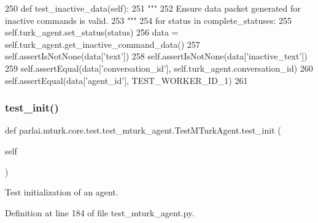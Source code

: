 \begin{DoxyCode}
250     \textcolor{keyword}{def }test\_inactive\_data(self):
251         \textcolor{stringliteral}{"""}
252 \textcolor{stringliteral}{        Ensure data packet generated for inactive commands is valid.}
253 \textcolor{stringliteral}{        """}
254         \textcolor{keywordflow}{for} status \textcolor{keywordflow}{in} complete\_statuses:
255             self.turk\_agent.set\_status(status)
256             data = self.turk\_agent.get\_inactive\_command\_data()
257             self.assertIsNotNone(data[\textcolor{stringliteral}{'text'}])
258             self.assertIsNotNone(data[\textcolor{stringliteral}{'inactive\_text'}])
259             self.assertEqual(data[\textcolor{stringliteral}{'conversation\_id'}], self.turk\_agent.conversation\_id)
260             self.assertEqual(data[\textcolor{stringliteral}{'agent\_id'}], TEST\_WORKER\_ID\_1)
261 
\end{DoxyCode}
\mbox{\label{classparlai_1_1mturk_1_1core_1_1test_1_1test__mturk__agent_1_1TestMTurkAgent_a3b8d51776b4199c34d195cf489c4e0bd}} 
\subsubsection{\texorpdfstring{test\+\_\+init()}{test\_init()}}
{\footnotesize\ttfamily def parlai.\+mturk.\+core.\+test.\+test\+\_\+mturk\+\_\+agent.\+Test\+M\+Turk\+Agent.\+test\+\_\+init (\begin{DoxyParamCaption}\item[{}]{self }\end{DoxyParamCaption})}

\begin{DoxyVerb}Test initialization of an agent.
\end{DoxyVerb}
 

Definition at line 184 of file test\+\_\+mturk\+\_\+agent.\+py.


